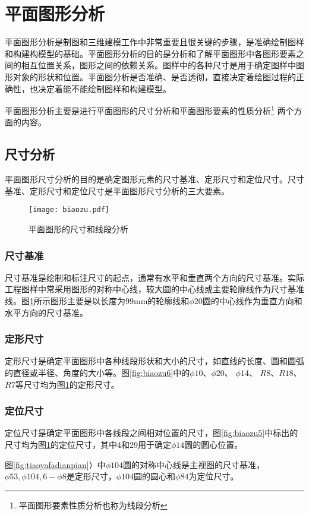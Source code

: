 \section{平面图形分析}
平面图形分析是制图和三维建模工作中非常重要且很关键的步骤，是准确绘制图样和构建构模型的基础。平面图形分析的目的是分析和了解平面图形中各图形要素之间的相互位置关系，图形之间的依赖关系。图样中的各种尺寸是用于确定图样中图形对象的形状和位置。平面图分析是否准确、是否透彻，直接决定着绘图过程的正确性，也决定着能不能绘制图样和构建模型。

平面图形分析主要是进行平面图形的尺寸分析和平面图形要素的性质分析\footnote{平面图形要素性质分析也称为线段分析} 两个方面的内容。

\subsection{尺寸分析}
平面图形尺寸分析的目的是确定图形元素的尺寸基准、定形尺寸和定位尺寸。尺寸基准、定形尺寸和定位尺寸是平面图形尺寸分析的三大要素。

\begin{figure}[htbp]
\centering
\texttt{[image: biaozu.pdf]}
\caption{平面图形的尺寸和线段分析} \label{fig:biaozu}
\end{figure}

\subsubsection{尺寸基准} 

尺寸基准是绘制和标注尺寸的起点，通常有水平和垂直两个方向的尺寸基准。实际工程图样中常采用图形的对称中心线，较大圆的中心线或主要轮廓线作为尺寸基准线。图\ref{fig:biaozu}所示图形主要是以长度为99mm的轮廓线和$\phi 20$圆的中心线作为垂直方向和水平方向的尺寸基准。

\subsubsection{定形尺寸} 

定形尺寸是确定平面图形中各种线段形状和大小的尺寸，如直线的长度、圆和圆弧的直径或半径、角度的大小等。图\ref{fig:biaozu6}中的$\phi 10$、$\phi 20$、 $\phi 14$、 $R8$、$R18$、$R7$等尺寸均为图\ref{fig:biaozu}的定形尺寸。

\begin{figure}[htbp]
\centering
\begin{floatrow}
\end{floatrow}
\end{figure}

\subsubsection{定位尺寸} 

定位尺寸是确定平面图形中各线段之间相对位置的尺寸，图\ref{fig:biaozu5}中标出的尺寸均为图\ref{fig:biaozu}的定位尺寸，其中4和29用于确定$\phi 14$圆的圆心位置。

图\ref{fig:tiaoyafadianpian}）中$\phi 104$圆的对称中心线是主视图的尺寸基准，$\phi 53,\phi 104,6-\phi 8$是定形尺寸，$\phi 104$圆的圆心和$\phi 84$为定位尺寸。

\endinput